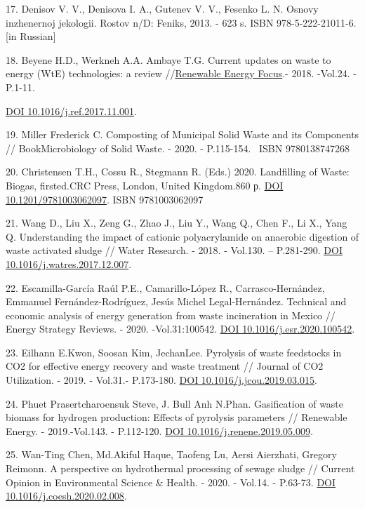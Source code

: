 \begin{references}
17. Denisov V. V., Denisova I. A., Gutenev V. V., Fesenko L. N. Osnovy
inzhenernoj jekologii. Rostov n/D: Feniks, 2013. - 623 s. ISBN
978-5-222-21011-6. {[}in Russian{]}

18. Beyene H.D., Werkneh A.A. Ambaye T.G. Current updates on waste to
energy (WtE) technologies: a review
//\href{https://www.sciencedirect.com/journal/renewable-energy-focus}{Renewable
Energy Focus}.- 2018. -Vol.24. -P.1-11.

\href{https://doi.org/10.1016/j.ref.2017.11.001}{DOI
10.1016/j.ref.2017.11.001}.

19. Miller Frederick C. Composting of Municipal Solid Waste and its
Components // BookMicrobiology of Solid Waste. - 2020. - P.115-154.
~ISBN 9780138747268

20. Christensen T.H., Cossu R., Stegmann R. (Eds.) 2020. Landfilling of
Waste: Biogas, firsted.CRC Press, London, United Kingdom.860 р.
\href{https://doi.org/10.1201/9781003062097}{DOI 10.1201/9781003062097}.
ISBN 9781003062097

21. Wang D., Liu X., Zeng G., Zhao J., Liu Y., Wang Q., Chen F., Li X.,
Yang Q. Understanding the impact of cationic polyacrylamide on anaerobic
digestion of waste activated sludge // Water Research. - 2018. -
Vol.130. -- P.281-290.
\href{https://doi.org/10.1016/j.watres.2017.12.007}{DOI
10.1016/j.watres.2017.12.007}.

22. Escamilla-García Raúl P.E., Camarillo-López R., Carrasco-Hernández,
Emmanuel Fernández-Rodríguez, Jesús Michel Legal-Hernández. Technical
and economic analysis of energy generation from waste incineration in
Mexico // Energy Strategy Reviews. - 2020. -Vol.31:100542.
\href{https://doi.org/10.1016/j.esr.2020.100542}{DOI
10.1016/j.esr.2020.100542}.

23. Eilhann E.Kwon, Soosan Kim, JechanLee. Pyrolysis of waste feedstocks
in CO2 for effective energy recovery and waste treatment // Journal of
CO2 Utilization. - 2019. - Vol.31.- P.173-180.
\href{https://doi.org/10.1016/j.jcou.2019.03.015}{DOI
10.1016/j.jcou.2019.03.015}.

24. Phuet Prasertcharoensuk Steve, J. Bull Anh N.Phan. Gasification of
waste biomass for hydrogen production: Effects of pyrolysis parameters
// Renewable Energy. - 2019.-Vol.143. - P.112-120.
\href{https://doi.org/10.1016/j.renene.2019.05.009}{DOI
10.1016/j.renene.2019.05.009}.

25. Wan-Ting Chen, Md.Akiful Haque, Taofeng Lu, Aersi Aierzhati, Gregory
Reimonn. A perspective on hydrothermal processing of sewage sludge //
Current Opinion in Environmental Science \& Health. - 2020. - Vol.14. -
P.63-73. \href{https://doi.org/10.1016/j.coesh.2020.02.008}{DOI
10.1016/j.coesh.2020.02.008}.


\end{references}
